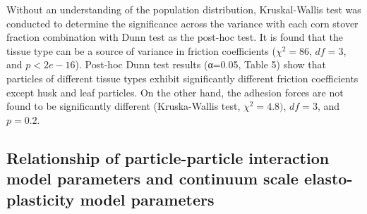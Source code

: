 \documentclass[xcolor=dvipsnames,10pt,hidelinks]{article}
\let\oldsubsection\subsection
\renewcommand{\subsection}{\clearpage\oldsubsection}
\begin{document}
Without an understanding of the population distribution,
Kruskal-Wallis test was conducted to determine the significance across the variance with each corn stover fraction combination with Dunn test as the post-hoc test.
It is found that the tissue type can be a source of variance in friction coefficients (\(\chi^2 = 86\), \(df = 3\), and \(p < 2e-16\)).
Post-hoc Dunn test results (α=0.05, Table 5) show that particles of different tissue types exhibit significantly different friction coefficients except husk and leaf particles.
On the other hand, the adhesion forces are not found to be significantly different (Kruska-Wallis test, \(\chi^2 = 4.8)\), \(df = 3\), and \(p = 0.2\).
\subsection{Relationship of particle-particle interaction model parameters and continuum scale elasto-plasticity model parameters}
\label{sec:orgaf757ce}
\end{document}

